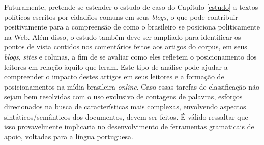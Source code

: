 Futuramente, pretende-se estender o estudo de caso do Capítulo \ref{estudo} a textos políticos escritos por cidadãos comuns em seus \emph{blogs}, o que pode contribuir positivamente para a compreensão de como o brasileiro se posiciona politicamente na Web. Além disso, o estudo também deve ser ampliado para identificar os pontos de vista contidos nos comentários feitos aos artigos do corpus, em seus \emph{blogs}, \emph{sites} e colunas, a fim de se avaliar como eles refletem o posicionamento dos leitores em relação àquilo que leram. Este tipo de análise pode ajudar a compreender o impacto destes artigos em seus leitores e a formação de posicionamentos na mídia brasileira \emph{online}. Caso essas tarefas de classificação não sejam bem resolvidas com o uso exclusivo de contagens de palavras, esforços direcionados na busca de características mais complexas, envolvendo aspectos sintáticos/semânticos dos documentos, devem ser feitos. É válido ressaltar que isso provavelmente implicaria no desenvolvimento de ferramentas gramaticais de apoio, voltadas para a língua portuguesa.


